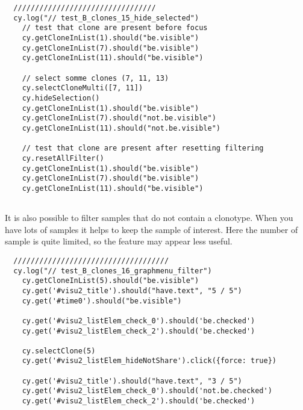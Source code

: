 \begin{verbatim}
  /////////////////////////////////
  cy.log("// test_B_clones_15_hide_selected")
    // test that clone are present before focus
    cy.getCloneInList(1).should("be.visible")
    cy.getCloneInList(7).should("be.visible")
    cy.getCloneInList(11).should("be.visible")

    // select somme clones (7, 11, 13)
    cy.selectCloneMulti([7, 11])
    cy.hideSelection()
    cy.getCloneInList(1).should("be.visible")
    cy.getCloneInList(7).should("not.be.visible")
    cy.getCloneInList(11).should("not.be.visible")
    
    // test that clone are present after resetting filtering
    cy.resetAllFilter()
    cy.getCloneInList(1).should("be.visible")
    cy.getCloneInList(7).should("be.visible")
    cy.getCloneInList(11).should("be.visible")


\end{verbatim}


It is also possible to filter samples that do not contain a clonotype.  When you
have lots of samples it helps to keep the sample of interest.  Here the number
of sample is quite limited, so the feature may appear less useful.

\begin{verbatim}
  ////////////////////////////////////
  cy.log("// test_B_clones_16_graphmenu_filter")
    cy.getCloneInList(5).should("be.visible")
    cy.get('#visu2_title').should("have.text", "5 / 5")
    cy.get('#time0').should("be.visible")

    cy.get('#visu2_listElem_check_0').should('be.checked')
    cy.get('#visu2_listElem_check_2').should('be.checked')

    cy.selectClone(5)
    cy.get('#visu2_listElem_hideNotShare').click({force: true})

    cy.get('#visu2_title').should("have.text", "3 / 5")
    cy.get('#visu2_listElem_check_0').should('not.be.checked')
    cy.get('#visu2_listElem_check_2').should('be.checked')


\end{verbatim}

